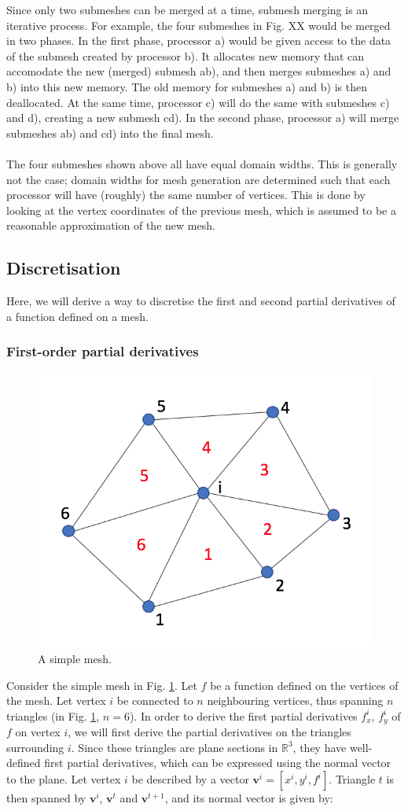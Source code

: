 \documentclass{article}
\begin{document}
Since only two submeshes can be merged at a time, submesh merging is an iterative process. For example, the four submeshes in Fig. XX would be merged in two phases. In the first phase, processor a) would be given access to the data of the submesh created by processor b). It allocates new memory that can accomodate the new (merged) submesh ab), and then merges submeshes a) and b) into this new memory. The old memory for submeshes a) and b) is then deallocated. At the same time, processor c) will do the same with submeshes c) and d), creating a new submesh cd). In the second phase, processor a) will merge submeshes ab) and cd) into the final mesh.\\
\\
The four submeshes shown above all have equal domain widths. This is generally not the case; domain widths for mesh generation are determined such that each processor will have (roughly) the same number of vertices. This is done by looking at the vertex coordinates of the previous mesh, which is assumed to be a reasonable approximation of the new mesh.


\newpage
\subsection{Discretisation}

Here, we will derive a way to discretise the first and second partial derivatives of a function defined on a mesh.

\subsubsection{First-order partial derivatives}

\begin{figure}[H] \label{fig:mesh_disc_01}
  \includegraphics[width=0.3\linewidth]{Fig_mesh_disc_01.png}
  \caption{A simple mesh.}
\end{figure}

Consider the simple mesh in Fig. \ref{fig:mesh_disc_01}. Let $f$ be a function defined on the vertices of the mesh. Let vertex $i$ be connected to $n$ neighbouring vertices, thus spanning $n$ triangles (in Fig. \ref{fig:mesh_disc_01}, $n=6$). In order to derive the first partial derivatives $f_x^i$, $f_y^i$ of $f$ on vertex $i$, we will first derive the partial derivatives on the triangles surrounding $i$. Since these triangles are plane sections in $\mathbb{R}^{3}$, they have well-defined first partial derivatives, which can be expressed using the normal vector to the plane. Let vertex $i$ be described by a vector $\textbf{v}^i=\left[x^i,y^i,f^i\right]$. Triangle $t$ is then spanned by $\textbf{v}^i$, $\textbf{v}^t$ and $\textbf{v}^{t+1}$, and its normal vector is given by:
\end{document}
